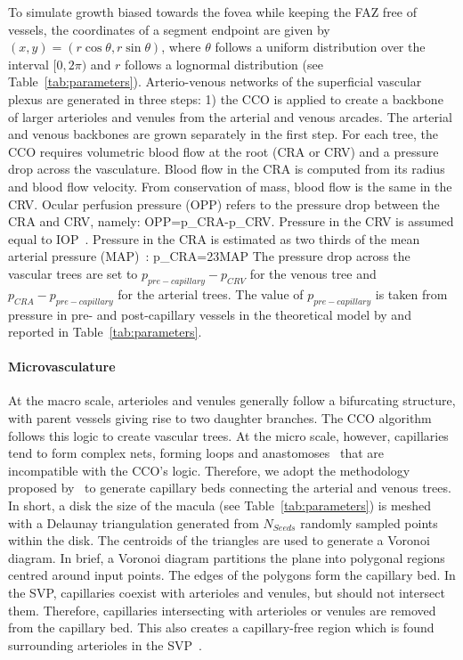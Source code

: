 \documentclass[11pt,]{article}
\let\oldequation\equation
\let\oldendequation\endequation
\renewenvironment{equation}
  {\linenomathNonumbers\oldequation}
  {\oldendequation\endlinenomath}
\begin{document}
To simulate growth biased towards the fovea while keeping the FAZ free
of vessels, the coordinates of a segment endpoint are given by
$(x,y)=(r\cos\theta, r\sin\theta)$, where $\theta$ follows a uniform
distribution over the interval $[0,2\pi)$ and $r$ follows a lognormal
distribution (see Table~\ref{tab:parameters}). Arterio-venous
networks of the superficial vascular plexus are generated in three
steps: 1) the CCO is applied to create a backbone of larger arterioles
and venules from the arterial and venous arcades. The arterial and
venous backbones are grown separately in the first step. For each
tree, the CCO requires volumetric blood flow at the root (CRA or CRV)
and a pressure drop across the vasculature. Blood flow in the CRA is
computed from its radius and blood flow velocity. From conservation of
mass, blood flow is the same in the CRV.
Ocular perfusion pressure (OPP) refers to the pressure drop between the CRA and CRV, namely:
\begin{equation}
OPP=p_{CRA}-p_{CRV}.\label{eq:OPP}
\end{equation}
Pressure in the CRV is assumed equal to IOP~\cite{Arciero2013,Guidoboni2014,Zheng2010}.
Pressure in the CRA is estimated as two thirds of the mean arterial pressure (MAP)~\cite{Arciero2013,Guidoboni2014,Zheng2010}:
\begin{equation}
p_{CRA}=\frac23MAP\label{eq:pCRA}
\end{equation}
The pressure drop across the vascular trees are set to
$p_{pre-capillary}-p_{CRV}$ for the venous tree and
$p_{CRA}-p_{pre-capillary}$ for the arterial trees. The value of
$p_{pre-capillary}$ is taken from pressure in pre- and post-capillary vessels in
the theoretical model by \citet{Takahashi2009} and reported in
Table~\ref{tab:parameters}.

\paragraph{Microvasculature}\label{sec:microvasculature} At the macro
scale, arterioles and venules generally follow a bifurcating
structure, with parent vessels giving rise to two daughter
branches. The CCO algorithm follows this logic to create vascular
trees.  At the micro scale, however, capillaries tend to form complex
nets, forming loops and anastomoses~\cite{An2020} that are
incompatible with the CCO’s logic. Therefore, we adopt the methodology
proposed by~\cite{Linninger2013} to generate capillary beds connecting
the arterial and venous trees.  In short, a disk the size of the
macula (see Table~\ref{tab:parameters}) is meshed with a Delaunay
triangulation generated from $N_{Seeds}$ randomly sampled points
within the disk.
The centroids of the triangles are used to generate a Voronoi diagram.
In brief, a Voronoi diagram partitions the plane into polygonal regions centred around input points. 
The edges of the polygons form the capillary bed.
In the SVP, capillaries coexist with arterioles and venules, but should not intersect them.
Therefore, capillaries intersecting with arterioles or venules are removed from the capillary bed.
This also creates a capillary-free region which is found surrounding arterioles in the SVP~\cite{An2020}.
\end{document}
